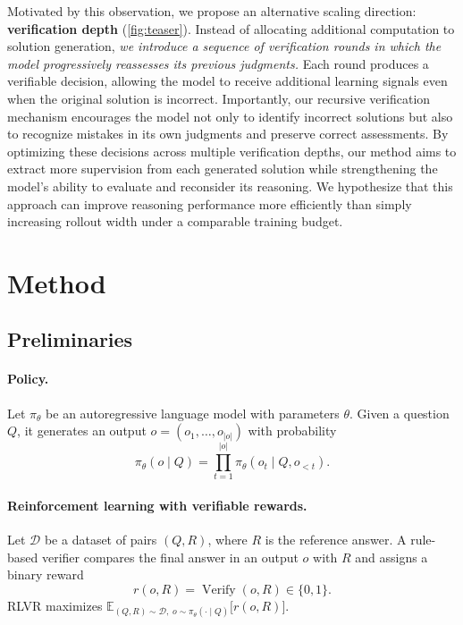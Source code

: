 \documentclass[11pt]{article}
\theoremstyle{definition}
\theoremstyle{plain}
\begin{document}
Motivated by this observation, we propose an alternative scaling direction: \textbf{verification depth} (\cref{fig:teaser}). Instead of allocating additional computation to solution generation, \textit{we introduce a sequence of verification rounds in which the model progressively reassesses its previous judgments.} Each round produces a verifiable decision, allowing the model to receive additional learning signals even when the original solution is incorrect. Importantly, our recursive verification mechanism encourages the model not only to identify incorrect solutions but also to recognize mistakes in its own judgments and preserve correct assessments. By optimizing these decisions across multiple verification depths, our method aims to extract more supervision from each generated solution while strengthening the model's ability to evaluate and reconsider its reasoning. We hypothesize that this approach can improve reasoning performance more efficiently than simply increasing rollout width under a comparable training budget.


\section{Method}

\subsection{Preliminaries}

\paragraph{Policy.}
Let $\pi_\theta$ be an autoregressive language model with parameters $\theta$. Given a question $Q$, it generates an output $o=(o_1,\ldots,o_{|o|})$ with probability
\begin{equation}
\pi_\theta(o\mid Q)=\prod_{t=1}^{|o|}\pi_\theta(o_t\mid Q,o_{<t}).
\end{equation}


\paragraph{Reinforcement learning with verifiable rewards.}
Let $\mathcal D$ be a dataset of pairs $(Q,R)$, where $R$ is the reference answer. A rule-based verifier compares the final answer in an output $o$ with $R$ and assigns a binary reward \[r(o,R)=\operatorname{Verify}(o,R)\in\{0,1\}.\] RLVR maximizes $\mathbb E_{(Q,R)\sim\mathcal D,\;o\sim\pi_\theta(\cdot\mid Q)}\big[r(o,R)\big]$.
\end{document}
